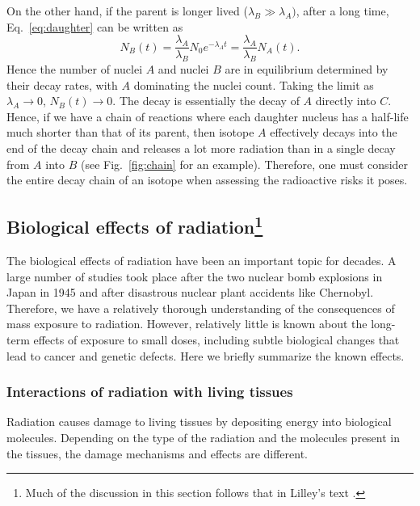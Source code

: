 \documentclass[nofootinbib,preprint,aps]{revtex4-1}
\begin{document}
        On the other hand, if the parent is longer lived
        ($\lambda_B \gg \lambda_A)$, after a long time, Eq.~\ref{eq:daughter} can be written as
        \begin{equation}
            N_B(t)=\frac{\lambda_A}{\lambda_B}N_0 e^{-\lambda_A t}=\frac{\lambda_A}{\lambda_B}N_A(t).
        \end{equation}
        Hence the number of nuclei $A$ and nuclei $B$ are in equilibrium determined by their decay rates, with
        $A$ dominating the nuclei count. Taking the limit as $\lambda_A \rightarrow 0$, $N_B(t)\rightarrow 0$.
        The decay is essentially the decay of $A$ directly into $C$. Hence, if we have a chain of reactions
        where each daughter nucleus has a half-life much shorter than that of its parent, then 
        isotope $A$ effectively decays into the end of the decay chain and releases a lot more radiation than
        in a single decay from $A$ into $B$ (see Fig.~\ref{fig:chain} for an example). Therefore, one must consider the entire decay chain of an isotope
        when assessing the radioactive risks it poses.

        \subsection{Biological effects of radiation\footnote{Much of the discussion in this section follows that in
        Lilley's text \cite[chapt. 7]{l01}.}}
        The biological effects of radiation have been an important topic for decades. A large
        number of studies took place after the two nuclear bomb explosions in Japan in 1945
        and after disastrous nuclear plant accidents like Chernobyl. Therefore, we have a relatively
        thorough understanding of the consequences of mass exposure to radiation. However, relatively
        little is known about the long-term effects of exposure to small doses, including subtle biological
        changes that lead to cancer and genetic defects. Here we briefly summarize the known effects.
        \subsubsection{Interactions of radiation with living tissues}
        \label{sec:interactions}
        Radiation causes damage to living tissues by depositing energy into biological molecules.
        Depending on the type of the radiation
        and the molecules present in the tissues, the damage mechanisms and effects are different.
\end{document}
